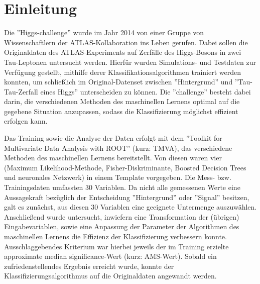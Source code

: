\section{Einleitung}

Die ''Higgs-challenge'' wurde im Jahr 2014 von einer Gruppe von Wissenschaftlern der ATLAS-Kollaboration ins Leben gerufen. Dabei sollen die Originaldaten des ATLAS-Experiments auf Zerfälle des Higgs-Bosons in zwei Tau-Leptonen untersucht werden. Hierfür wurden Simulations- und Testdaten zur Verfügung gestellt, mithilfe derer Klassifikationsalgorithmen trainiert werden konnten, um schließlich im Original-Datenset zwischen ''Hintergrund'' und ''Tau-Tau-Zerfall eines Higgs'' unterscheiden zu können. Die ''challenge'' besteht dabei darin, die verschiedenen Methoden des maschinellen Lernens optimal auf die gegebene Situation anzupassen, sodass die Klassifizierung möglichst effizient erfolgen kann.

Das Training sowie die Analyse der Daten erfolgt mit dem ''Toolkit for Multivariate Data Analysis with ROOT'' (kurz: TMVA), das verschiedene Methoden des maschinellen Lernens bereitstellt. Von diesen waren vier (Maximum Likelihood-Methode, Fisher-Diskriminante, Boosted Decision Trees und neuronales Netzwerk) in einem Template vorgegeben. Die Mess- bzw. Trainingsdaten umfassten 30 Variablen. Da nicht alle gemessenen Werte eine Aussagekraft bezüglich der Entscheidung ''Hintergrund'' oder ''Signal'' besitzen, galt es zunächst, aus diesen 30 Variablen eine geeignete Untermenge auszuwählen. Anschließend wurde untersucht, inwiefern eine Transformation der (übrigen) Eingabevariablen, sowie eine Anpassung der Parameter der Algorithmen des maschinellen Lernens die Effizienz der Klassifizierung verbessern konnte. Ausschlaggebendes Kriterium war hierbei jeweils der im Training erzielte approximate median significance-Wert (kurz: AMS-Wert). Sobald ein zufriedenstellendes Ergebnis erreicht wurde, konnte der Klassifizierungsalgorithmus auf die Originaldaten angewandt werden.